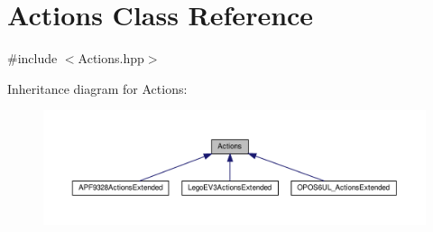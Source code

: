 \hypertarget{classActions}{}\section{Actions Class Reference}
\label{classActions}


{\ttfamily \#include $<$Actions.\+hpp$>$}



Inheritance diagram for Actions\+:
\nopagebreak
\begin{figure}[H]
\begin{center}
\leavevmode
\includegraphics[width=350pt]{classActions__inherit__graph}
\end{center}
\end{figure}
